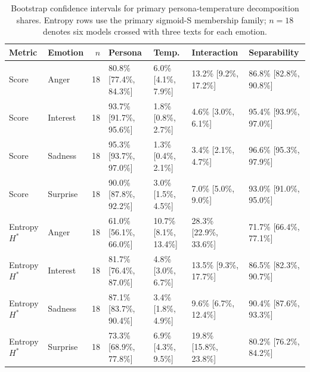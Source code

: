 \begin{table}[t]
\centering
\caption{Bootstrap confidence intervals for primary persona-temperature decomposition shares. Entropy rows use the primary sigmoid-S membership family; $n=18$ denotes six models crossed with three texts for each emotion.}
\label{tab:scis-bootstrap-ci}
\begin{tabular}{llrllll}
\hline
Metric & Emotion & $n$ & Persona & Temp. & Interaction & Separability \\
\hline
Score & Anger & 18 & 80.8\% [77.4\%, 84.3\%] & 6.0\% [4.1\%, 7.9\%] & 13.2\% [9.2\%, 17.2\%] & 86.8\% [82.8\%, 90.8\%] \\
Score & Interest & 18 & 93.7\% [91.7\%, 95.6\%] & 1.8\% [0.8\%, 2.7\%] & 4.6\% [3.0\%, 6.1\%] & 95.4\% [93.9\%, 97.0\%] \\
Score & Sadness & 18 & 95.3\% [93.7\%, 97.0\%] & 1.3\% [0.4\%, 2.1\%] & 3.4\% [2.1\%, 4.7\%] & 96.6\% [95.3\%, 97.9\%] \\
Score & Surprise & 18 & 90.0\% [87.8\%, 92.2\%] & 3.0\% [1.5\%, 4.5\%] & 7.0\% [5.0\%, 9.0\%] & 93.0\% [91.0\%, 95.0\%] \\
Entropy $H^*$ & Anger & 18 & 61.0\% [56.1\%, 66.0\%] & 10.7\% [8.1\%, 13.4\%] & 28.3\% [22.9\%, 33.6\%] & 71.7\% [66.4\%, 77.1\%] \\
Entropy $H^*$ & Interest & 18 & 81.7\% [76.4\%, 87.0\%] & 4.8\% [3.0\%, 6.7\%] & 13.5\% [9.3\%, 17.7\%] & 86.5\% [82.3\%, 90.7\%] \\
Entropy $H^*$ & Sadness & 18 & 87.1\% [83.7\%, 90.4\%] & 3.4\% [1.8\%, 4.9\%] & 9.6\% [6.7\%, 12.4\%] & 90.4\% [87.6\%, 93.3\%] \\
Entropy $H^*$ & Surprise & 18 & 73.3\% [68.9\%, 77.8\%] & 6.9\% [4.3\%, 9.5\%] & 19.8\% [15.8\%, 23.8\%] & 80.2\% [76.2\%, 84.2\%] \\
\hline
\end{tabular}
\end{table}
